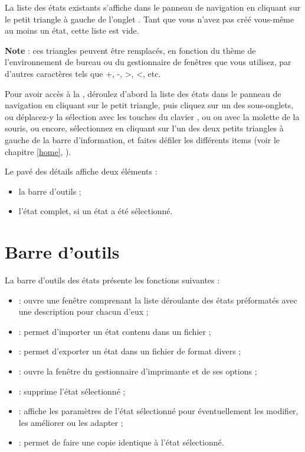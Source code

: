 La liste des états existants s'affiche dans le panneau de navigation en cliquant sur le petit triangle à gauche de l'onglet . Tant que vous n'avez pas créé vous-même au moins un état, cette liste est vide.

\textbf{Note} : ces triangles peuvent être remplacés, en fonction du thème de l'environnement de bureau ou du gestionnaire de fenêtres que vous utilisez, par d'autres caractères tels que +, -, >, <, etc.

Pour avoir accès à la , déroulez d'abord  la liste des états dans le panneau de navigation en cliquant sur le petit triangle, puis cliquez sur un des sous-onglets, ou déplacez-y la sélection avec les touches du clavier  ,  ou  ou avec la molette de la souris, ou encore, sélectionnez  en cliquant sur l'un des deux petits triangles à gauche de la barre d'information, et faites défiler les différents items (voir le chapitre \vref{home}, ).


Le pavé des détails affiche deux éléments :
\begin{itemize}
	 \item la barre d'outils ;
	 \item l'état complet, si un état a été sélectionné.
\end{itemize}

\newpage


\section{Barre d'outils\label{reports-functions}}


La barre d'outils des états présente les fonctions suivantes  :

\begin{itemize}
	 \item {} : ouvre une fenêtre comprenant la liste déroulante des états préformatés avec une description pour chacun d'eux ;
	 \item {} : permet d'importer un état contenu dans un fichier ;
	 \item {} : permet d'exporter un état dans un fichier de format 	divers ;
	 \item {} : ouvre la fenêtre du gestionnaire d'imprimante et de 	ses options ;
	 \item {} : supprime l'état sélectionné ;
	 \item {} : affiche les paramètres de l'état sélectionné pour éventuellement les modifier, les améliorer ou les adapter ;
	 \item {} : permet de faire une copie identique à l'état sélectionné.
\end{itemize}

